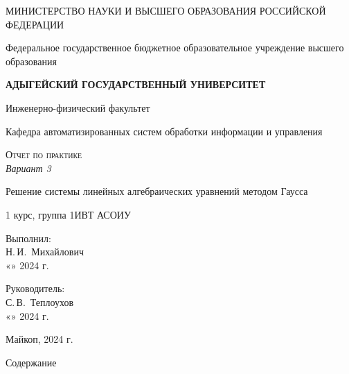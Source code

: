 \documentclass[12pt,a4paper]{scrartcl}
\begin{document}
	\begin{titlepage}
		\begin{center}
			\large
			МИНИСТЕРСТВО НАУКИ И ВЫСШЕГО ОБРАЗОВАНИЯ РОССИЙСКОЙ ФЕДЕРАЦИИ
			
			Федеральное государственное бюджетное образовательное учреждение высшего образования
			
			\textbf{АДЫГЕЙСКИЙ ГОСУДАРСТВЕННЫЙ УНИВЕРСИТЕТ}
			\vspace{0.25cm}
			
			Инженерно-физический факультет
			
			Кафедра автоматизированных систем обработки информации и управления
			\vfill

			\vfill
			
			\textsc{Отчет по практике}\\[5mm]
			
			\LARGE\textit{Вариант 3}
			
			{\LARGE Решение системы линейных алгебраических уравнений методом Гаусса}
			\bigskip
			
			1 курс, группа 1ИВТ АСОИУ
		\end{center}
		\vfill
		
		\newlength{\ML}
		\hfill\begin{minipage}{0.5\textwidth}
			Выполнил:\\
			\underline{\hspace{\ML}} Н.\,И.~Михайлович\\
			«\underline{\hspace{0.7cm}}» \underline{\hspace{2cm}} 2024 г.
		\end{minipage}%
		\bigskip
		
		\hfill\begin{minipage}{0.5\textwidth}
			Руководитель:\\
			\underline{\hspace{\ML}} С.\,В.~Теплоухов\\
			«\underline{\hspace{0.7cm}}» \underline{\hspace{2cm}} 2024 г.
		\end{minipage}%
		
		
		\vfill
		
		
		
		\begin{center}
			
			Майкоп, 2024 г.
		\end{center}
	\end{titlepage}
\LARGE{Содержание}
\end{document}
